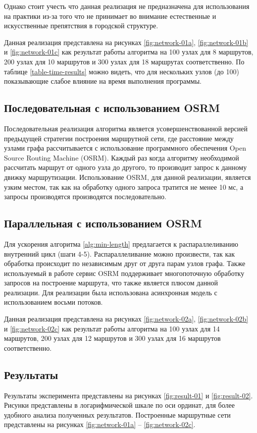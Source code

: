 Однако стоит учесть что данная реализация не предназначена для использования на практики из-за того что не 
принимает во внимание естественные и искусственные препятствия в городской структуре.

Данная реализация представлена на рисунках \ref{fig:network-01a}, \ref{fig:network-01b} и 
\ref{fig:network-01c} как результат работы алгоритма на 100 узлах для 8 маршрутов, 200 узлах для 10 маршрутов 
и 300 узлах для 18 маршрутах соответственно. По таблице \ref{table-time-results} можно видеть, что для 
нескольких узлов (до 100) показывающие слабое влияние на время выполнения программы.

\subsection{Последовательная с использованием OSRM}
Последовательная реализация алгоритма является усовершенствованной версией предыдущей стратегии построения 
маршрутной сети, где расстояние между узлами графа рассчитывается с использование программного обеспечения 
Open Source Routing Machine (OSRM). Каждый раз когда алгоритму необходимой рассчитать маршрут от одного узла 
до другого, то производит запрос к данному движку маршрутизации. Использование OSRM, для данной реализации, 
является узким местом, так как на обработку одного запроса тратится не менее 10 мс, а запросы производятся 
производятся последовательно. 

\subsection{Параллельная с использованием OSRM}
Для ускорения алгоритма \ref{alg:min-length} предлагается к распараллеливанию внутренний цикл (шаги 4-5).
Распараллеливание можно произвести, так как обработка происходит по независимым друг от друга парам узлов 
графа. Также используемый в работе сервис OSRM поддерживает многопоточную обработку запросов на построение 
маршрута, что также является плюсом данной реализации. Для реализации была использована асинхронная модель с 
использованием восьми потоков.

Данная реализация представлена на рисунках \ref{fig:network-02a}, \ref{fig:network-02b} и 
\ref{fig:network-02c} как результат работы алгоритма на 100 узлах для 14 маршрутов, 200 узлах для 12 маршрутов 
и 300 узлах для 16 маршрутов соответственно.

\subsection{Результаты}
Результаты эксперимента представлены на рисунках \ref{fig:result-01} и \ref{fig:result-02}. Рисунки 
представлены в логарифмической шкале по оси ординат, для более удобного анализа полученных результатов. 
Построенные маршрутные сети представлены на рисунках \ref{fig:network-01a} -- \ref{fig:network-02c}. 

